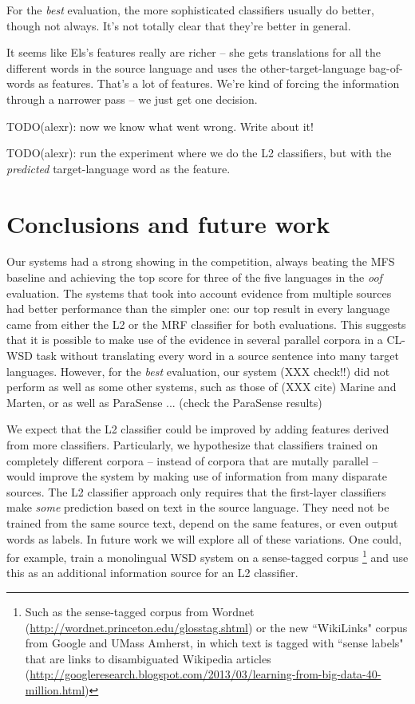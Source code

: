 \documentclass[11pt,letterpaper]{article}
\begin{document}
For the \emph{best} evaluation, the more sophisticated classifiers usually do
better, though not always. It's not totally clear that they're better in
general.

It seems like Els's features really are richer -- she gets translations for all
the different words in the source language and uses the other-target-language
bag-of-words as features. That's a lot of features. We're kind of forcing the
information through a narrower pass -- we just get one decision.

TODO(alexr): now we know what went wrong. Write about it!

TODO(alexr): run the experiment where we do the L2 classifiers, but with the
\emph{predicted} target-language word as the feature.

\section{Conclusions and future work}
Our systems had a strong showing in the competition, always beating the MFS
baseline and achieving the top score for three of the five languages in the
\emph{oof} evaluation. The systems that took into account evidence from
multiple sources had better performance than the simpler one: our top result in
every language came from either the L2 or the MRF classifier for
both evaluations. This suggests that it is possible to make use of the evidence
in several parallel corpora in a CL-WSD task without translating every word in
a source sentence into many target languages. However, for the \emph{best}
evaluation, our system (XXX check!!) did not perform as well as some other
systems, such as those of (XXX cite) Marine and Marten, or as well as ParaSense
... (check the ParaSense results)

We expect that the L2 classifier could be improved by adding features
derived
from more classifiers. Particularly, we hypothesize that classifiers trained on
completely different corpora -- instead of corpora that are mutally parallel --
would improve the system by making use of information from many disparate
sources. The L2 classifier approach only requires that the first-layer
classifiers make \emph{some} prediction based on text in the source language.
They need not be trained from the same source text, depend on the same
features, or even output words as labels. In future work we will explore
all of these variations. One could, for example, train a monolingual WSD system
on a sense-tagged corpus \footnote{Such as the sense-tagged corpus from Wordnet
(\url{http://wordnet.princeton.edu/glosstag.shtml})
or the new ``WikiLinks" corpus from Google and UMass Amherst, in which text is
tagged with ``sense labels" that are links to disambiguated Wikipedia
articles
(\url{http://googleresearch.blogspot.com/2013/03/learning-from-big-data-40-million.html})}
and use this as an additional information source for an L2 classifier.
\end{document}
